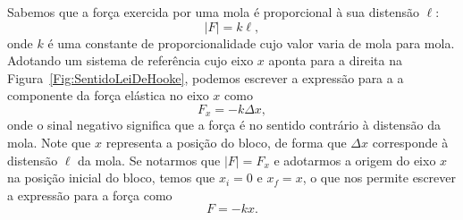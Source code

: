 Sabemos que a força exercida por uma mola é proporcional à sua distensão $\ell$:
\begin{equation}
	|F| = k \ell,
\end{equation}
%
onde $k$ é uma constante de proporcionalidade cujo valor varia de mola para mola. Adotando um sistema de referência cujo eixo $x$ aponta para a direita na Figura~\ref{Fig:SentidoLeiDeHooke}, podemos escrever a expressão para a a componente da força elástica no eixo $x$ como
\begin{equation}
    F_x = -k \Delta x,
\end{equation}
%
onde o sinal negativo significa que a força é no sentido contrário à distensão da mola. Note que $x$ representa a posição do bloco, de forma que $\Delta x$ corresponde à distensão $\ell$ da mola. Se notarmos que $|F| = F_x$ e adotarmos a origem do eixo $x$ na posição inicial do bloco, temos que $x_i = 0$ e $x_f = x$, o que nos permite escrever a expressão para a força como
\begin{equation}
    F = -kx.
\end{equation}


\begin{marginfigure}[1cm]
\centering
{}
\caption{Direção e sentido das forças em um sistema massa-mola.\label{Fig:MassaMolaEqDif}}
\end{marginfigure}

